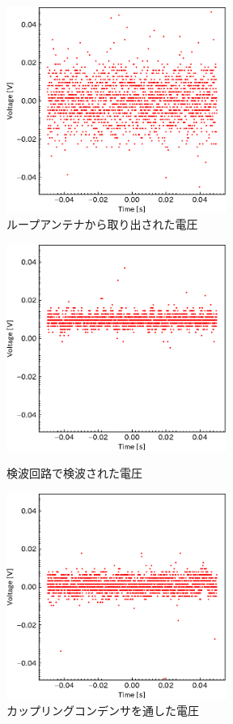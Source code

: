 \documentclass[report.tex]{subfiles}
\begin{document}
\begin{figure}[H]
	\centering
	\includegraphics[width=7.2cm]{fig/koil.pdf}
	\caption{ループアンテナから取り出された電圧}
	\label{fig:koil}
\end{figure}

\begin{figure}[H]
	\begin{minipage}[b]{0.5\linewidth}
		\centering
		\includegraphics[width=7.2cm]{fig/koil_diode.pdf}
		\caption{検波回路で検波された電圧}
		\label{fig:koil_diode}
	\end{minipage}
	\begin{minipage}[b]{0.5\linewidth}
		\centering
		\includegraphics[width=7.2cm]{fig/koil_diode_bi.pdf}
		\caption{カップリングコンデンサを通した電圧}
		\label{fig:koil_diode_bi}
	\end{minipage}
\end{figure}
\end{document}
